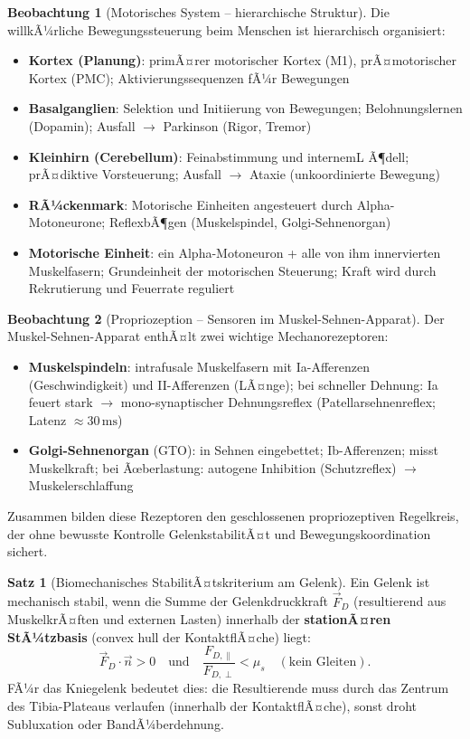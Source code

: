 ﻿\documentclass[a4paper,12pt]{report}
\theoremstyle{definition}
\newtheorem{satz}{Satz}
\newtheorem{beobachtung}{Beobachtung}
\begin{document}
\begin{beobachtung}[Motorisches System -- hierarchische Struktur]
Die willkÃ¼rliche Bewegungssteuerung beim Menschen ist hierarchisch organisiert:
\begin{itemize}
    \item[-] \textbf{Kortex (Planung)}: primÃ¤rer motorischer Kortex (M1),
          prÃ¤motorischer Kortex (PMC); Aktivierungssequenzen fÃ¼r Bewegungen
    \item[-] \textbf{Basalganglien}: Selektion und Initiierung von Bewegungen;
          Belohnungslernen (Dopamin); Ausfall $\to$ Parkinson (Rigor, Tremor)
    \item[-] \textbf{Kleinhirn (Cerebellum)}: Feinabstimmung und internemL Ã¶dell;
          prÃ¤diktive Vorsteuerung; Ausfall $\to$ Ataxie (unkoordinierte Bewegung)
    \item[-] \textbf{RÃ¼ckenmark}: Motorische Einheiten angesteuert durch
          Alpha-Motoneurone; ReflexbÃ¶gen (Muskelspindel, Golgi-Sehnenorgan)
    \item[-] \textbf{Motorische Einheit}: ein Alpha-Motoneuron + alle von ihm
          innervierten Muskelfasern; Grundeinheit der motorischen Steuerung;
          Kraft wird durch Rekrutierung und Feuerrate reguliert
\end{itemize}
\end{beobachtung}

\begin{beobachtung}[Propriozeption -- Sensoren im Muskel-Sehnen-Apparat]
Der Muskel-Sehnen-Apparat enthÃ¤lt zwei wichtige Mechanorezeptoren:
\begin{itemize}
    \item[-] \textbf{Muskelspindeln}: intrafusale Muskelfasern mit Ia-Afferenzen
          (Geschwindigkeit) und II-Afferenzen (LÃ¤nge); bei schneller Dehnung:
          Ia feuert stark $\to$ mono-synaptischer Dehnungsreflex
          (Patellarsehnenreflex; Latenz $\approx 30\,\mathrm{ms}$)
    \item[-] \textbf{Golgi-Sehnenorgan} (GTO): in Sehnen eingebettet;
          Ib-Afferenzen; misst Muskelkraft; bei Ãœberlastung:
          autogene Inhibition (Schutzreflex) $\to$ Muskelerschlaffung
\end{itemize}
Zusammen bilden diese Rezeptoren den geschlossenen propriozeptiven Regelkreis,
der ohne bewusste Kontrolle GelenkstabilitÃ¤t und Bewegungskoordination sichert.
\end{beobachtung}

\begin{satz}[Biomechanisches StabilitÃ¤tskriterium am Gelenk]
Ein Gelenk ist mechanisch stabil, wenn die Summe der Gelenkdruckkraft $\vec{F}_D$
(resultierend aus MuskelkrÃ¤ften und externen Lasten) innerhalb der
\textbf{stationÃ¤ren StÃ¼tzbasis} (convex hull der KontaktflÃ¤che) liegt:
\[
  \vec{F}_D\cdot\vec{n} > 0 \quad \text{und} \quad
  \frac{F_{D,\parallel}}{F_{D,\perp}} < \mu_s
  \quad (\text{kein Gleiten}).
\]
FÃ¼r das Kniegelenk bedeutet dies: die Resultierende muss durch das
Zentrum des Tibia-Plateaus verlaufen (innerhalb der KontaktflÃ¤che),
sonst droht Subluxation oder BandÃ¼berdehnung.
\end{satz}
\end{document}
